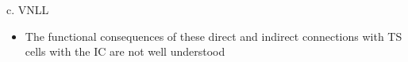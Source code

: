 c. VNLL

\begin{itemize}
\item The functional consequences of these direct and indirect connections with TS cells with the IC are not well understood
\end{itemize}

